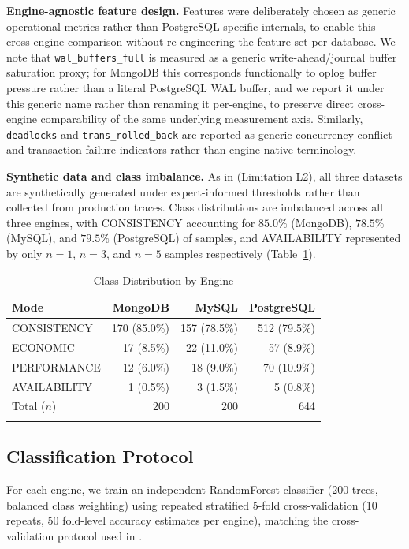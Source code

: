 \documentclass[pdflatex,sn-mathphys-num]{sn-jnl}
\theoremstyle{thmstyleone}
\theoremstyle{thmstylethree}
\begin{document}
\textbf{Engine-agnostic feature design.} Features were deliberately
chosen as generic operational metrics rather than PostgreSQL-specific
internals, to enable this cross-engine comparison without
re-engineering the feature set per database. We note that
\texttt{wal\_buffers\_full} is measured as a generic write-ahead/journal
buffer saturation proxy; for MongoDB this corresponds functionally to
oplog buffer pressure rather than a literal PostgreSQL WAL buffer, and
we report it under this generic name rather than renaming it
per-engine, to preserve direct cross-engine comparability of the same
underlying measurement axis. Similarly, \texttt{deadlocks} and
\texttt{trans\_rolled\_back} are reported as generic
concurrency-conflict and transaction-failure indicators rather than
engine-native terminology.

\textbf{Synthetic data and class imbalance.} As in \cite{iaha2026}
(Limitation L2), all three datasets are synthetically generated under
expert-informed thresholds rather than collected from production
traces. Class distributions are imbalanced across all three engines,
with CONSISTENCY accounting for $85.0\%$ (MongoDB), $78.5\%$ (MySQL),
and $79.5\%$ (PostgreSQL) of samples, and AVAILABILITY represented by
only $n=1$, $n=3$, and $n=5$ samples respectively
(Table~\ref{tab:class-dist}).

\begin{table}[h]
\caption{Class Distribution by Engine}\label{tab:class-dist}
\begin{tabular}{@{}lrrr@{}}
\toprule
Mode & MongoDB & MySQL & PostgreSQL \\
\midrule
CONSISTENCY  & 170 (85.0\%) & 157 (78.5\%) & 512 (79.5\%) \\
ECONOMIC     & 17 (8.5\%)   & 22 (11.0\%)  & 57 (8.9\%)   \\
PERFORMANCE  & 12 (6.0\%)   & 18 (9.0\%)   & 70 (10.9\%)  \\
AVAILABILITY & 1 (0.5\%)    & 3 (1.5\%)    & 5 (0.8\%)    \\
\midrule
Total ($n$)  & 200 & 200 & 644 \\
\botrule
\end{tabular}
\end{table}

\subsection{Classification Protocol}\label{subsec:protocol}

For each engine, we train an independent RandomForest classifier
(200 trees, balanced class weighting) using repeated stratified 5-fold
cross-validation (10 repeats, 50 fold-level accuracy estimates per
engine), matching the cross-validation protocol used
in \cite{iaha2026}.
\end{document}
